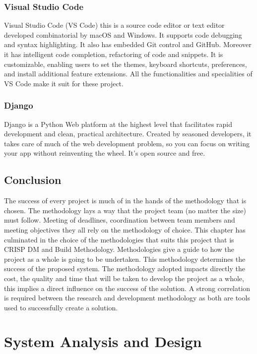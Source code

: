 \documentclass[12pt]{report}
\begin{document}
	\subsection{Visual Studio Code}
	Visual Studio Code (VS Code) this is a source code editor or text editor developed combinatorial by macOS and Windows. It supports code debugging and syntax highlighting. It also has embedded Git control and GitHub. Moreover it has intelligent code completion, refactoring of code and snippets. It is customizable, enabling users to set the themes, keyboard shortcuts, preferences, and install additional feature extensions. All the functionalities and specialities of VS Code make it suit for these project. \\
	
	\subsection{Django}
	Django is a Python Web platform at the highest level that facilitates rapid development and clean, practical architecture. Created by seasoned developers, it takes care of much of the web development problem, so you can focus on writing your app without reinventing the wheel. It's open source and free.\\
		
	\section{Conclusion}
	The success of every project is much of in the hands of the methodology that is chosen. The methodology lays a way that the project team (no matter the size) must follow. Meeting of deadlines, coordination between team members and meeting objectives they all rely on the methodology of choice. This chapter has culminated in the choice of the methodologies that suits this project that is CRISP DM and Build Methodology. Methodologies give a guide to how the project as a whole is going to be undertaken. This methodology determines the success of the proposed system. The methodology adopted impacts directly the cost, the quality and time that will be taken to develop the project as a whole, this implies a direct influence on the success of the solution. A strong correlation is required between the research and development methodology as both are tools used to successfully create a solution.\\
	
	\chapter{System Analysis and Design}
\end{document}
